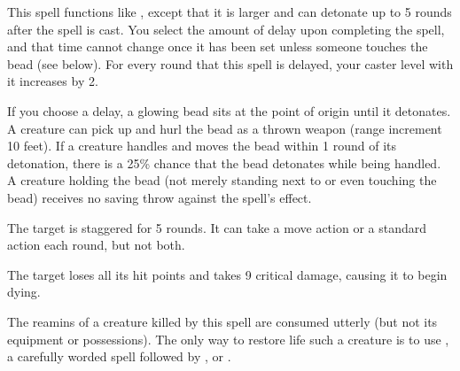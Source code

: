 \begin{spelleffect}
  This spell functions like , except that it is larger and can detonate up to 5 rounds after the spell is cast. You select the amount of delay upon completing the spell, and that time cannot change once it has been set unless someone touches the bead (see below). For every round that this spell is delayed, your caster level with it increases by 2.

  If you choose a delay, a glowing bead sits at the point of origin until it detonates. A creature can pick up and hurl the bead as a thrown weapon (range increment 10 feet). If a creature handles and moves the bead within 1 round of its detonation, there is a 25\% chance that the bead detonates while being handled. A creature holding the bead (not merely standing next to or even touching the bead) receives no saving throw against the spell's effect.
\end{spelleffect}

\spellrng{\rngclose}
\begin{spellhealthy}
  The target is staggered for 5 rounds. It can take a move action or a standard action each round, but not both.
\end{spellhealthy}
\begin{spellblood}
  The target loses all its hit points and takes 9 critical damage, causing it to begin dying.
\end{spellblood}
\begin{spellnotes}
  The reamins of a creature killed by this spell are consumed utterly (but not its equipment or possessions). The only way to restore life such a creature is to use , a carefully worded  spell followed by , or .
\end{spellnotes}

